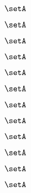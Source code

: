 {\begin{forslides}
        \begin{equation}
            \label{eq:combination-164}
            \setA
        \end{equation}

        \begin{equation}
            \label{eq:combination-165}
            \setA
        \end{equation}

        \begin{equation}
            \label{eq:combination-166}
            \setA
        \end{equation}

        \begin{equation}
            \label{eq:combination-167}
            \setA
        \end{equation}

        \begin{equation}
            \label{eq:combination-168}
            \setA
        \end{equation}

        \begin{equation}
            \label{eq:combination-169}
            \setA
        \end{equation}

        \begin{equation}
            \label{eq:combination-170}
            \setA
        \end{equation}

        \begin{equation}
            \label{eq:combination-171}
            \setA
        \end{equation}

        \begin{equation}
            \label{eq:combination-172}
            \setA
        \end{equation}

        \begin{equation}
            \label{eq:combination-173}
            \setA
        \end{equation}

        \begin{equation}
            \label{eq:combination-174}
            \setA
        \end{equation}

        \begin{equation}
            \label{eq:combination-175}
            \setA
        \end{equation}


\end{forslides}}
